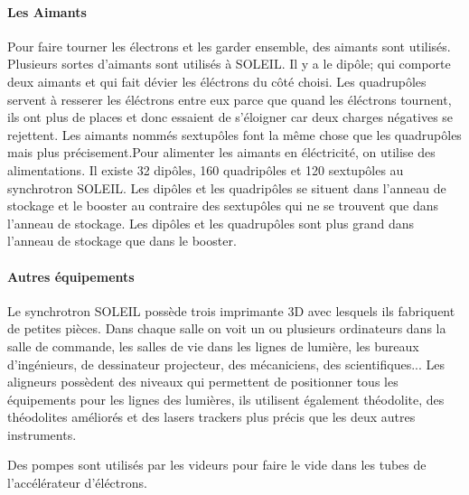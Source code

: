 			\paragraph{Les Aimants}
				Pour faire tourner les électrons et les garder ensemble, des aimants sont utilisés. Plusieurs sortes d'aimants sont utilisés à SOLEIL. Il y a le dipôle; qui comporte deux aimants et qui fait dévier les éléctrons du côté choisi. Les quadrupôles servent à resserer les éléctrons entre eux parce que quand les éléctrons tournent, ils ont plus de places et donc essaient de s'éloigner car deux charges négatives se rejettent. Les aimants nommés sextupôles font la même chose que les quadrupôles mais plus précisement.Pour alimenter les aimants en éléctricité, on utilise des alimentations. Il existe 32 dipôles, 160 quadripôles et 120 sextupôles au synchrotron SOLEIL. Les dipôles et les quadripôles se situent dans l'anneau de stockage et le booster au contraire des sextupôles qui ne se trouvent que dans l'anneau de stockage. Les dipôles et les quadrupôles sont plus grand dans l'anneau de stockage que dans le booster.

			\paragraph{Autres équipements}
				Le synchrotron SOLEIL possède trois imprimante 3D avec lesquels ils fabriquent de petites pièces. Dans chaque salle on voit un ou plusieurs ordinateurs\; dans la salle de commande, les salles de vie dans les lignes de lumière, les bureaux d'ingénieurs, de dessinateur projecteur, des mécaniciens, des scientifiques... Les aligneurs possèdent des niveaux qui permettent de positionner tous les équipements pour les lignes des lumières, ils utilisent également théodolite, des théodolites améliorés et des lasers trackers plus précis que les deux autres instruments.

				Des pompes sont utilisés par les videurs pour faire le vide dans les tubes de l'accélérateur d'éléctrons.





%
%